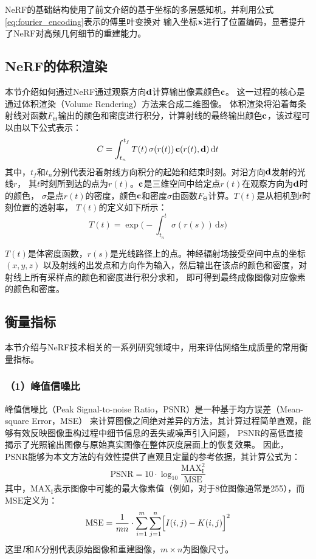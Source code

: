 NeRF的基础结构使用了前文介绍的基于坐标的多层感知机，并利用公式\eqref{eq:fourier_encoding}表示的傅里叶变换对
输入坐标$\bf x$进行了位置编码，显著提升了NeRF对高频几何细节的重建能力。

\subsection{NeRF的体积渲染}

本节介绍如何通过NeRF通过观察方向$\bf d$计算输出像素颜色$\bf c$。
这一过程的核心是通过体积渲染（Volume Rendering）方法来合成二维图像。
体积渲染将沿着每条射线对函数$F_{\upTheta}$输出的颜色和密度进行积分，计算射线的最终输出颜色$\bf c$，该过程可以由以下公式表示：
\begin{equation}\label{eq:volume_rendering}
C=\int_{t_n}^{t_f}T(t)\,\sigma(r(t))\,{\bf c}(r(t),{\bf d})\,\mathrm{d}t
\end{equation}
其中，$t_f$和$t_n$分别代表沿着射线方向积分的起始和结束时刻。对沿方向$\bf{d}$发射的光线$r$，
其$t$时刻所到达的点为$r(t)$。$\bf{c}$是三维空间中给定点$r(t)$在观察方向为$\bf{d}$时的颜色，
$\sigma$是点$r(t)$的密度，颜色$\bf c$和密度$\sigma$由函数$F_{\upTheta}$计算。$T(t)$是从相机到$t$时刻位置的透射率，
$T(t)$的定义如下所示：
\begin{equation}\label{eq:transmittance}
T(t)=\exp\Biggl(-\int_{t_n}^{t}\sigma(r(s))\,\mathrm{d}s\Biggr)
\end{equation}

$T\left(t\right)$是体密度函数，$r\left(s\right)$是光线路径上的点。神经辐射场接受空间中点的坐标$\left(x,y,z\right)$
以及射线的出发点和方向作为输入，然后输出在该点的颜色和密度，对射线上所有采样点的颜色和密度进行积分求和，
即可得到最终成像图像对应像素的颜色和密度。

\subsection{衡量指标}

本节介绍与NeRF技术相关的一系列研究领域中，用来评估网络生成质量的常用衡量指标。

\subsubsection*{（1）峰值信噪比} 

峰值信噪比（Peak Signal-to-noise Ratio，PSNR）是一种基于均方误差（Mean-square Error，MSE）
来计算图像之间绝对差异的方法，其计算过程简单直观，能够有效反映图像重构过程中细节信息的丢失或噪声引入问题，
PSNR的高低直接揭示了光照输出图像与原始真实图像在整体灰度层面上的恢复效果。
因此，PSNR能够为本文方法的有效性提供了直观且定量的参考依据，其计算公式为：
\begin{equation}\label{eq:PSNR}
\mathrm{PSNR}=10\cdot\log_{10}\frac{\mathrm{MAX}_\mathrm{I}^2}{\mathrm{MSE}}
\end{equation}
其中，$\mathrm{MAX}_\mathrm{I}$表示图像中可能的最大像素值（例如，对于8位图像通常是255），而$\mathrm{MSE}$定义为：
\begin{equation}\label{eq:MSE}
\mathrm{MSE}=\frac{1}{mn}\cdot\sum_{i=1}^{m}\sum_{j=1}^{n}\Bigl[I(i,j)-K(i,j)\Bigr]^2
\end{equation}
这里$I$和$K$分别代表原始图像和重建图像，$m\times n$为图像尺寸。


